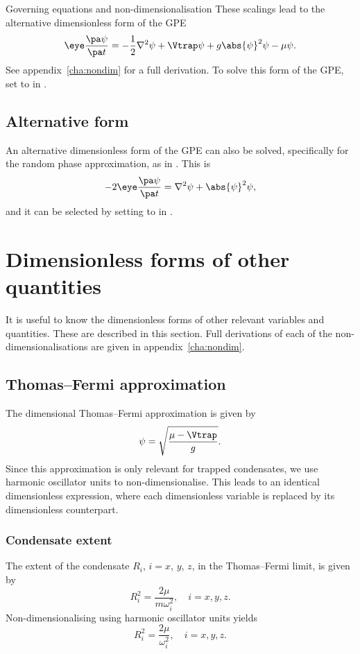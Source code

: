 \begin{chapter}{\label{cha:equations}Governing equations and
  non-dimensionalisation}
  These scalings lead to the alternative dimensionless form of the GPE
  \begin{equation*}
    \eye \frac{\pa \psi}{\pa t} = -\frac{1}{2}\nabla^{2}\psi + \Vtrap\psi +
    g\abs{\psi}^{2}\psi - \mu\psi.
  \end{equation*}
  See appendix~\ref{cha:nondim} for a full derivation.  To solve this form of
  the GPE, set  to  in .

  \subsection{Alternative form}
  An alternative dimensionless form of the GPE can also be solved, specifically
  for the random phase approximation, as in \citet{BS02}.  This is
  \begin{equation*}
    -2\eye\frac{\pa \psi}{\pa t} = \nabla^{2}\psi + \abs{\psi}^{2}\psi,
  \end{equation*}
  and it can be selected by setting  to  in
  .

  \section{Dimensionless forms of other quantities}
  It is useful to know the dimensionless forms of other relevant variables and
  quantities.  These are described in this section.  Full derivations of each
  of the non-dimensionalisations are given in appendix~\ref{cha:nondim}.

  \subsection{Thomas--Fermi approximation}
  The dimensional Thomas--Fermi approximation is given by
  \begin{equation*}
    \psi = \sqrt{\frac{\mu-\Vtrap}{g}}.
  \end{equation*}
  Since this approximation is only relevant for trapped condensates, we use
  harmonic oscillator units to non-dimensionalise.  This leads to an identical
  dimensionless expression, where each dimensionless variable is replaced by
  its dimensionless counterpart.

  \subsubsection{Condensate extent}
  The extent of the condensate $R_{i}$, $i = x$, $y$, $z$, in the Thomas--Fermi
  limit, is given by
  \begin{equation*}
    R_{i}^{2} = \frac{2\mu}{m\omega_{i}^{2}}, \quad i = x, y, z.
  \end{equation*}
  Non-dimensionalising using harmonic oscillator units yields
  \begin{equation*}
    R_{i}^{2} = \frac{2\mu}{\omega_{i}^{2}}, \quad i = x, y, z.
  \end{equation*}


\end{chapter}
